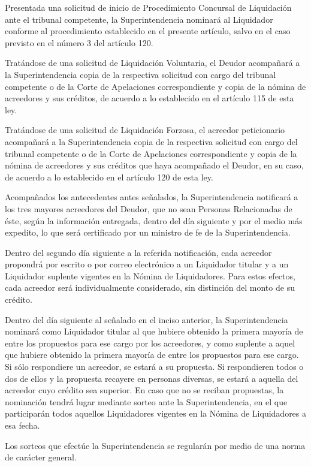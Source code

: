 \documentclass[
]{book}
\begin{document}
Presentada una solicitud de inicio de Procedimiento Concursal de Liquidación ante el tribunal competente, la Superintendencia nominará al Liquidador conforme al procedimiento establecido en el presente artículo, salvo en el caso previsto en el número 3 del artículo 120.

Tratándose de una solicitud de Liquidación Voluntaria, el Deudor acompañará a la Superintendencia copia de la respectiva solicitud con cargo del tribunal competente o de la Corte de Apelaciones correspondiente y copia de la nómina de acreedores y sus créditos, de acuerdo a lo establecido en el artículo 115 de esta ley.

Tratándose de una solicitud de Liquidación Forzosa, el acreedor peticionario acompañará a la Superintendencia copia de la respectiva solicitud con cargo del tribunal competente o de la Corte de Apelaciones correspondiente y copia de la nómina de acreedores y sus créditos que haya acompañado el Deudor, en su caso, de acuerdo a lo establecido en el artículo 120 de esta ley.

Acompañados los antecedentes antes señalados, la Superintendencia notificará a los tres mayores acreedores del Deudor, que no sean Personas Relacionadas de éste, según la información entregada, dentro del día siguiente y por el medio más expedito, lo que será certificado por un ministro de fe de la Superintendencia.

Dentro del segundo día siguiente a la referida notificación, cada acreedor propondrá por escrito o por correo electrónico a un Liquidador titular y a un Liquidador suplente vigentes en la Nómina de Liquidadores. Para estos efectos, cada acreedor será individualmente considerado, sin distinción del monto de su crédito.

Dentro del día siguiente al señalado en el inciso anterior, la Superintendencia nominará como Liquidador titular al que hubiere obtenido la primera mayoría de entre los propuestos para ese cargo por los acreedores, y como suplente a aquel que hubiere obtenido la primera mayoría de entre los propuestos para ese cargo. Si sólo respondiere un acreedor, se estará a su propuesta. Si respondieren todos o dos de ellos y la propuesta recayere en personas diversas, se estará a aquella del acreedor cuyo crédito sea superior. En caso que no se reciban propuestas, la nominación tendrá lugar mediante sorteo ante la Superintendencia, en el que participarán todos aquellos Liquidadores vigentes en la Nómina de Liquidadores a esa fecha.

Los sorteos que efectúe la Superintendencia se regularán por medio de una norma de carácter general.
\end{document}
